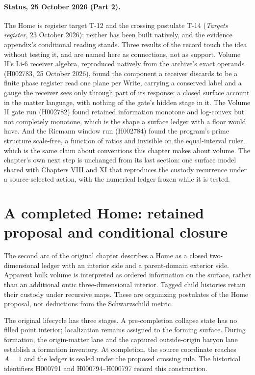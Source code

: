 \paragraph*{Status, 25 October 2026 (Part 2).} The Home is register target T-12 and the crossing postulate T-14 (\textit{Targets register}, 23 October 2026); neither has been built natively, and the evidence appendix's conditional reading stands. Three results of the record touch the idea without testing it, and are named here as connections, not as support. Volume II's Li-6 receiver algebra, reproduced natively from the archive's exact operands (H002783, 25 October 2026), found the component a receiver discards to be a finite phase register read one plane per Write, carrying a conserved label and a gauge the receiver sees only through part of its response: a closed surface account in the matter language, with nothing of the gate's hidden stage in it. The Volume II gate run (H002782) found retained information monotone and log-convex but not completely monotone, which is the shape a surface ledger with a floor would have. And the Riemann window run (H002784) found the program's prime structure scale-free, a function of ratios and invisible on the equal-interval ruler, which is the same claim about conventions this chapter makes about volume. The chapter's own next step is unchanged from its last section: one surface model shared with Chapters VIII and XI that reproduces the custody recurrence under a source-selected action, with the numerical ledger frozen while it is tested.

\section{A completed Home: retained proposal and conditional closure}
The second arc of the original chapter describes a Home as a closed two-dimensional ledger with an interior side and a parent-domain exterior side. Apparent bulk volume is interpreted as ordered information on the surface, rather than an additional ontic three-dimensional interior. Tagged child histories retain their custody under recursive maps. These are organizing postulates of the Home proposal, not deductions from the Schwarzschild metric.

The original lifecycle has three stages. A pre-completion collapse state has no filled point interior; localization remains assigned to the forming surface. During formation, the origin-matter lane and the captured outside-origin baryon lane establish a formation inventory. At completion, the source coordinate reaches $A=1$ and the ledger is sealed under the proposed crossing rule. The historical identifiers H000791 and H000794--H000797 record this construction.

